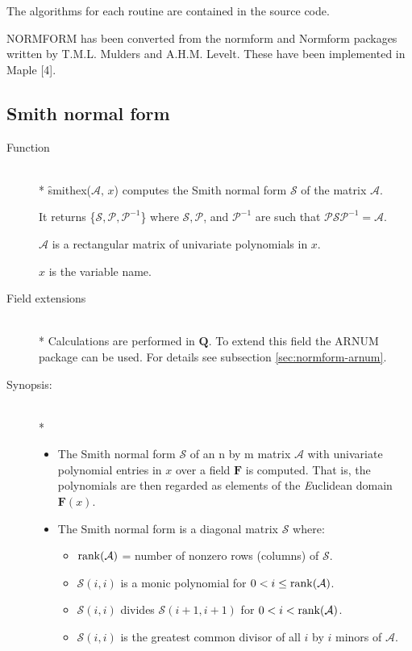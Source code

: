 The algorithms for each routine are contained in the source code.

{\small NORMFORM} has been converted from the normform and Normform 
packages written by T.M.L. Mulders and A.H.M. Levelt. These have been 
implemented in Maple [4].


\subsection{Smith normal form}

\begin{description}
\item[Function]\mbox{}\\*
\f{smithex}($\mathcal{A},\, x$) computes the Smith normal form $\mathcal{ S}$
of the matrix $\mathcal{ A}$.

It returns \{$\mathcal{ S}, \mathcal{ P}, \mathcal{ P}^{-1}$\} where $\mathcal{ S}, 
\mathcal{ P}$, and $\mathcal{ P}^{-1}$ are such that $\mathcal{ P S P}^{-1} = 
\mathcal{ A}$.

$\mathcal{ A}$ is a rectangular matrix of univariate polynomials in $x$.

$x$ is the variable name.

\item[Field extensions]\mbox{}\\*
Calculations are performed in $\mathbf{Q}$. To extend this field the 
{\small ARNUM} package can be used. For details see subsection \ref{sec:normform-arnum}.

\item[Synopsis:]\mbox{}\\*
\begin{itemize}
\item The Smith normal form $\mathcal{S}$ of an n by m matrix $\mathcal{A}$ 
with univariate polynomial entries in $x$ over a field $\mathbf{F}$ is 
computed. That is, the polynomials are then regarded as elements of the
{\it E}uclidean domain $\mathbf{F}(x)$.

\item The Smith normal form is a diagonal matrix $\mathcal{S}$ where:

  \begin{itemize}
  \item $\mathop{\mathrm{rank}}(\mathcal{A})$ = number of nonzero rows (columns) of 
        $\mathcal{S}$.
  \item $\mathcal{S}(i,i)$ is a monic polynomial for $0 < i \leq \mathop{\mathrm{rank}}(\mathcal{A})$.
  \item $\mathcal{S}(i,i)$ divides $\mathcal{S}(i+1,i+1)$ for $0 < i < \mathop{\mathrm{rank}}(\mathcal{A})$.
  \item $\mathcal{ S}(i,i)$ is the greatest common divisor of all $i$ by 
        $i$ minors of $\mathcal{A}$.
  \end{itemize}


\end{itemize}
\end{description}
